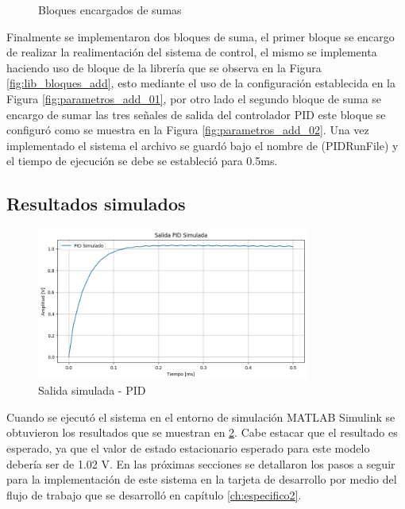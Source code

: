 \begin{figure}[htbp]
    \caption{Bloques encargados de sumas}
    \label{fig:arreglo_add}
\end{figure}

\newpage

Finalmente se implementaron dos bloques de suma, el primer bloque se encargo de realizar la realimentación del sistema de control, el mismo se implementa haciendo uso de bloque de la librería que se observa en la Figura \ref{fig:lib_bloques_add}, esto mediante el uso de la configuración establecida en la Figura \ref{fig:parametros_add_01}, por otro lado el segundo bloque de suma se encargo de sumar las tres señales de salida del controlador PID este bloque se configuró como se muestra en la Figura \ref{fig:parametros_add_02}. Una vez implementado el sistema el archivo se guardó bajo el nombre de (PIDRunFile) y el tiempo de ejecución se debe se estableció para 0.5ms. 

\subsection{Resultados simulados}\label{subsub:resultados_simulados_PID}

\begin{figure}[h!]
    \centering
    \includegraphics[width=0.8\textwidth]{fig/Capitulo5/Caso_de_estudio_PID/datos/simulada.png}
    \caption{Salida simulada - PID }
    \label{fig:salida_simulada_PID}
\end{figure}


Cuando se ejecutó el sistema en el entorno de simulación MATLAB Simulink se obtuvieron los resultados que se muestran en \ref{fig:salida_simulada_PID}. Cabe estacar que el resultado es esperado, ya que el valor de estado estacionario esperado para este modelo debería ser de 1.02 V. En las próximas secciones se detallaron los pasos a seguir para la implementación de este sistema en la tarjeta de desarrollo por medio del flujo de trabajo que se desarrolló en capítulo \ref{ch:especifico2}. 


